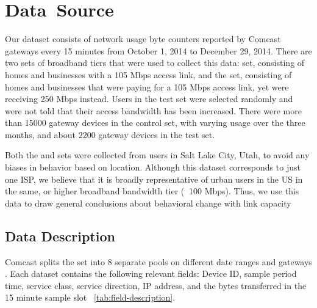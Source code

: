 \section{\mbox{Data Source}}
\label{sec:data}
Our dataset consists of network usage byte counters reported by Comcast gateways every 15 minutes from October 1, 2014 to December 29, 2014. There are two sets of broadband tiers that were used to collect this data: \control set, consisting of homes and businesses with a 105 Mbps access link, and the \test set, consisting of homes and businesses that were paying for a 105 Mbps access link, yet were receiving 250 Mbps instead. Users in the test set were selected randomly and were not told that their access bandwidth has been increased. There were more than 15000 gateway devices in the control set, with varying usage over the three months, and about 2200 gateway devices in the test set.

Both the \test and \control sets were collected from users in Salt Lake City, Utah, to avoid any biases in behavior based on location. Although this dataset corresponds to just one ISP, we believe that it is broadly representative of urban users in the US in the same, or higher broadband bandwidth tier ($\>$ 100 Mbps). Thus, we use this data to draw general conclusions about behavioral change with link capacity 



\subsection{Data Description}

Comcast splits the \control set into 8 separate pools on different date ranges and gateways . Each dataset contains the following relevant fields: Device ID, sample period time, service class, service direction, IP address, and the bytes transferred in the 15 minute sample slot ~\ref{tab:field-description}. 


